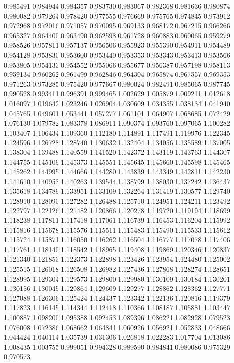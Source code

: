 0.985491
0.984944
0.984357
0.983730
0.983067
0.982368
0.981636
0.980874
0.980082
0.979264
0.978420
0.977555
0.976669
0.975765
0.974845
0.973912
0.972968
0.972016
0.971057
0.970095
0.969133
0.968172
0.967215
0.966266
0.965327
0.964400
0.963490
0.962598
0.961728
0.960883
0.960065
0.959279
0.958526
0.957811
0.957137
0.956506
0.955923
0.955390
0.954911
0.954489
0.954128
0.953830
0.953600
0.953440
0.953353
0.953343
0.953413
0.953566
0.953805
0.954133
0.954552
0.955066
0.955677
0.956387
0.957198
0.958113
0.959134
0.960262
0.961499
0.962846
0.964304
0.965874
0.967557
0.969353
0.971263
0.973285
0.975420
0.977667
0.980024
0.982491
0.985065
0.987745
0.990528
0.993411
0.996391
0.999465
1.002629
1.005879
1.009211
1.012618
1.016097
1.019642
1.023246
1.026904
1.030609
1.034355
1.038134
1.041940
1.045765
1.049601
1.053441
1.057277
1.061101
1.064907
1.068685
1.072429
1.076130
1.079782
1.083378
1.086911
1.090374
1.093760
1.097065
1.100282
1.103407
1.106434
1.109360
1.112180
1.114891
1.117491
1.119976
1.122345
1.124596
1.126728
1.128740
1.130632
1.132404
1.134056
1.135589
1.137005
1.138304
1.139488
1.140559
1.141520
1.142372
1.143119
1.143763
1.144307
1.144755
1.145109
1.145373
1.145551
1.145645
1.145660
1.145598
1.145465
1.145262
1.144995
1.144666
1.144280
1.143839
1.143349
1.142811
1.142230
1.141610
1.140953
1.140263
1.139544
1.138799
1.138030
1.137242
1.136437
1.135618
1.134789
1.133951
1.133109
1.132264
1.131419
1.130577
1.129740
1.128910
1.128090
1.127282
1.126488
1.125710
1.124951
1.124211
1.123492
1.122797
1.122126
1.121482
1.120866
1.120278
1.119720
1.119194
1.118699
1.118238
1.117811
1.117418
1.117061
1.116739
1.116453
1.116204
1.115992
1.115816
1.115678
1.115576
1.115511
1.115483
1.115490
1.115533
1.115612
1.115724
1.115871
1.116050
1.116262
1.116504
1.116777
1.117078
1.117406
1.117761
1.118140
1.118542
1.118965
1.119408
1.119869
1.120346
1.120837
1.121340
1.121853
1.122373
1.122898
1.123426
1.123954
1.124480
1.125002
1.125515
1.126018
1.126508
1.126982
1.127436
1.127868
1.128274
1.128651
1.128995
1.129304
1.129573
1.129800
1.129980
1.130109
1.130184
1.130201
1.130156
1.130045
1.129864
1.129609
1.129277
1.128862
1.128362
1.127771
1.127088
1.126306
1.125424
1.124437
1.123342
1.122136
1.120816
1.119379
1.117823
1.116145
1.114344
1.112418
1.110366
1.108187
1.105881
1.103447
1.100887
1.098200
1.095388
1.092453
1.089396
1.086221
1.082928
1.079523
1.076008
1.072386
1.068662
1.064841
1.060926
1.056921
1.052833
1.048666
1.044424
1.040114
1.035739
1.031306
1.026818
1.022283
1.017704
1.013086
1.008435
1.003755
0.999051
0.994328
0.989590
0.984841
0.980086
0.975329
0.970573
